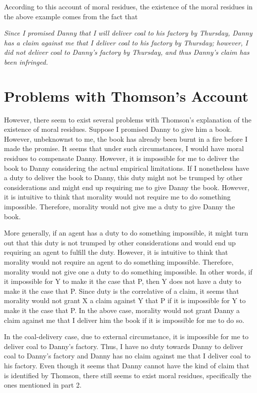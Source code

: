 According to this account of moral residues, the existence of the moral
residues in the above example comes from the fact that

\begin{displayquote} \def\labelenumi{(\arabic{enumi})}
	\itshape Since I promised Danny that I will deliver coal to his factory by
Thursday, Danny has a claim against me that I deliver coal to his
factory by Thursday; however, I did not deliver coal to Danny's factory
by Thursday, and thus Danny's claim has been infringed.
\end{displayquote}

\section{Problems with Thomson's Account}

However, there seem to exist several problems with Thomson's explanation
of the existence of moral residues. Suppose I promised Danny to give him
a book. However, unbeknownst to me, the book has already been burnt in a
fire before I made the promise. It seems that under such circumstances,
I would have moral residues to compensate Danny. However, it is
impossible for me to deliver the book to Danny considering the actual
empirical limitations. If I nonetheless have a duty to deliver the book
to Danny, this duty might not be trumped by other considerations and
might end up requiring me to give Danny the book. However, it is
intuitive to think that morality would not require me to do something
impossible. Therefore, morality would not give me a duty to give Danny
the book.

More generally, if an agent has a duty to do something impossible, it
might turn out that this duty is not trumped by other considerations and
would end up requiring an agent to fulfill the duty. However, it is
intuitive to think that morality would not require an agent to do
something impossible. Therefore, morality would not give one a duty to
do something impossible. In other words, if it impossible for Y to make
it the case that P, then Y does not have a duty to make it the case that
P. Since duty is the correlative of a claim, it seems that morality
would not grant X a claim against Y that P if it is impossible for Y to
make it the case that P. In the above case, morality would not grant
Danny a claim against me that I deliver him the book if it is impossible
for me to do so.

In the coal-delivery case, due to external circumstance, it is
impossible for me to deliver coal to Danny's factory. Thus, I have no
duty towards Danny to deliver coal to Danny's factory and Danny has no
claim against me that I deliver coal to his factory. Even though it
seems that Danny cannot have the kind of claim that is identified by
Thomson, there still seems to exist moral residues, specifically the
ones mentioned in part 2.

